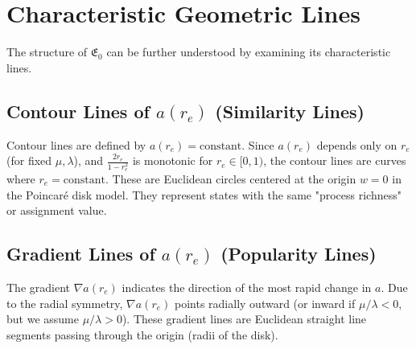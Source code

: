 \documentclass{article}
\begin{document}
\section{Characteristic Geometric Lines}

The structure of $\mathfrak{E}_0$ can be further understood by examining its characteristic lines.

\subsection{Contour Lines of $a(r_e)$ (Similarity Lines)}
Contour lines are defined by $a(r_e) = \text{constant}$. Since $a(r_e)$ depends only on $r_e$ (for fixed $\mu, \lambda$), and $\frac{2r_e}{1-r_e^2}$ is monotonic for $r_e \in [0,1)$, the contour lines are curves where $r_e = \text{constant}$. These are Euclidean circles centered at the origin $w=0$ in the Poincaré disk model. They represent states with the same "process richness" or assignment value.

\subsection{Gradient Lines of $a(r_e)$ (Popularity Lines)}
The gradient $\nabla a(r_e)$ indicates the direction of the most rapid change in $a$. Due to the radial symmetry, $\nabla a(r_e)$ points radially outward (or inward if $\mu/\lambda < 0$, but we assume $\mu/\lambda > 0$). These gradient lines are Euclidean straight line segments passing through the origin (radii of the disk).
\end{document}
